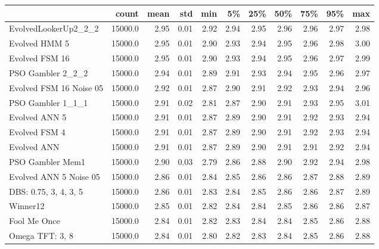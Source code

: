\begin{tabular}{lrrrrrrrrrr}
\toprule
{} &    count &  mean &   std &   min &    5\% &   25\% &   50\% &   75\% &   95\% &   max \\
\midrule
EvolvedLookerUp2\_2\_2    &  15000.0 &  2.95 &  0.01 &  2.92 &  2.94 &  2.95 &  2.96 &  2.96 &  2.97 &  2.98 \\
Evolved HMM 5           &  15000.0 &  2.95 &  0.01 &  2.90 &  2.93 &  2.94 &  2.95 &  2.96 &  2.98 &  3.00 \\
Evolved FSM 16          &  15000.0 &  2.95 &  0.01 &  2.90 &  2.93 &  2.94 &  2.95 &  2.96 &  2.97 &  2.99 \\
PSO Gambler 2\_2\_2       &  15000.0 &  2.94 &  0.01 &  2.89 &  2.91 &  2.93 &  2.94 &  2.95 &  2.96 &  2.97 \\
Evolved FSM 16 Noise 05 &  15000.0 &  2.92 &  0.01 &  2.87 &  2.90 &  2.91 &  2.92 &  2.93 &  2.94 &  2.96 \\
PSO Gambler 1\_1\_1       &  15000.0 &  2.91 &  0.02 &  2.81 &  2.87 &  2.90 &  2.91 &  2.93 &  2.95 &  3.01 \\
Evolved ANN 5           &  15000.0 &  2.91 &  0.01 &  2.87 &  2.89 &  2.90 &  2.91 &  2.92 &  2.93 &  2.94 \\
Evolved FSM 4           &  15000.0 &  2.91 &  0.01 &  2.87 &  2.89 &  2.90 &  2.91 &  2.92 &  2.93 &  2.94 \\
Evolved ANN             &  15000.0 &  2.91 &  0.01 &  2.87 &  2.89 &  2.90 &  2.91 &  2.91 &  2.92 &  2.94 \\
PSO Gambler Mem1        &  15000.0 &  2.90 &  0.03 &  2.79 &  2.86 &  2.88 &  2.90 &  2.92 &  2.94 &  2.98 \\
Evolved ANN 5 Noise 05  &  15000.0 &  2.86 &  0.01 &  2.84 &  2.85 &  2.86 &  2.86 &  2.87 &  2.88 &  2.89 \\
DBS: 0.75, 3, 4, 3, 5   &  15000.0 &  2.86 &  0.01 &  2.83 &  2.84 &  2.85 &  2.86 &  2.86 &  2.87 &  2.89 \\
Winner12                &  15000.0 &  2.85 &  0.01 &  2.82 &  2.84 &  2.84 &  2.85 &  2.86 &  2.86 &  2.87 \\
Fool Me Once            &  15000.0 &  2.84 &  0.01 &  2.82 &  2.83 &  2.84 &  2.84 &  2.85 &  2.86 &  2.88 \\
Omega TFT: 3, 8         &  15000.0 &  2.84 &  0.01 &  2.80 &  2.82 &  2.83 &  2.84 &  2.85 &  2.86 &  2.88 \\
\bottomrule
\end{tabular}
